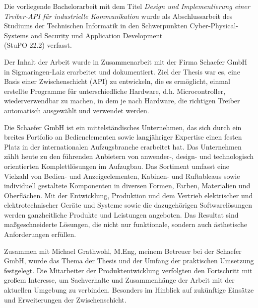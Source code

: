 Die vorliegende Bachelorarbeit mit dem Titel \textit{Design und Implementierung einer Treiber-API für industrielle Kommunikation} wurde als Abschlussarbeit des Studiums der Technischen Informatik in den Schwerpunkten Cyber-Physical-Systems and Security und Application Development\\ (StuPO 22.2) verfasst.

Der Inhalt der Arbeit wurde in Zusammenarbeit mit der Firma Schaefer GmbH in Sigmaringen-Laiz erarbeitet und dokumentiert.
Ziel der Thesis war es, eine Basis einer Zwischenschicht (API) zu entwickeln, die es ermöglicht, einmal erstellte Programme für unterschiedliche Hardware, d.h. Microcontroller, wiederverwendbar zu machen, in dem je nach Hardware, die richtigen Treiber automatisch ausgewählt und verwendet werden.

Die Schaefer GmbH ist ein mittelständisches Unternehmen, das sich durch ein breites Portfolio an Bedienelementen sowie langjähriger Expertise einen festen Platz in der internationalen Aufzugsbranche erarbeitet hat. 
Das Unternehmen zählt heute zu den führenden Anbietern von anwender-, design- und technologisch orientierten Komplettlösungen im Aufzugbau.
Das Sortiment umfasst eine Vielzahl von Bedien- und Anzeigeelementen, Kabinen- und Ruftableaus sowie individuell gestaltete Komponenten in diversen Formen, Farben, Materialien und Oberflächen. 
Mit der Entwicklung, Produktion und dem Vertrieb elektrischer und elektrotechnischer Geräte und Systeme sowie die dazugehörigen Softwarelösungen werden ganzheitliche Produkte und Leistungen angeboten.
Das Resultat sind maßgeschneiderte Lösungen, die nicht nur funktionale, sondern auch ästhetische Anforderungen erfüllen. 

Zusammen mit Michael Grathwohl, M.Eng, meinem Betreuer bei der Schaefer GmbH, wurde das Thema der Thesis und der Umfang der praktischen Umsetzung festgelegt.
Die Mitarbeiter der Produktentwicklung verfolgten den Fortschritt mit großem Interesse, um Sachverhalte und Zusammenhänge der Arbeit mit der aktuellen Umgebung zu verbinden.
Besonders im Hinblick auf zukünftige Einsätze und Erweiterungen der Zwischenschicht.

